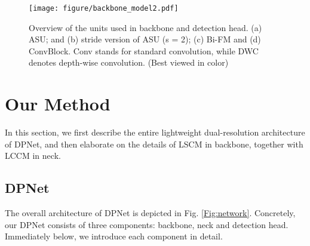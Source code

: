 \documentclass[lettersize,journal]{IEEEtran}
\begin{document}
\begin{table}\small\tabcolsep 0.5pt \caption{The detailed architecture of backbone in DPNet.  denotes stride 2, LRP and HRP indicate low-resolution and high-resolution paths, respectively.}
\renewcommand\arraystretch{1.5}
\begin{center}
\end{center}
\label{tab:DPNet}
\end{table}
\begin{figure*}[t!] 
\centering 
\texttt{[image: figure/backbone\_model2.pdf]} 
\caption{Overview of the units used in backbone and detection head. (a) ASU; and (b) stride version of ASU (s = 2); (c) Bi-FM and (d) ConvBlock. Conv stands for standard convolution, while DWC denotes depth-wise convolution. (Best viewed in color)} 
\label{Fig:Blocks} 
\end{figure*}


\section{Our Method}\label{sec:DPNet}

In this section, we first describe the entire lightweight dual-resolution architecture of DPNet, and then elaborate on the details of LSCM in backbone, together with LCCM in neck.

\subsection{DPNet}

The overall architecture of DPNet is depicted in Fig. \ref{Fig:network}. Concretely, our DPNet consists of three components: backbone, neck and detection head. Immediately below, we introduce each component in detail.
\end{document}
